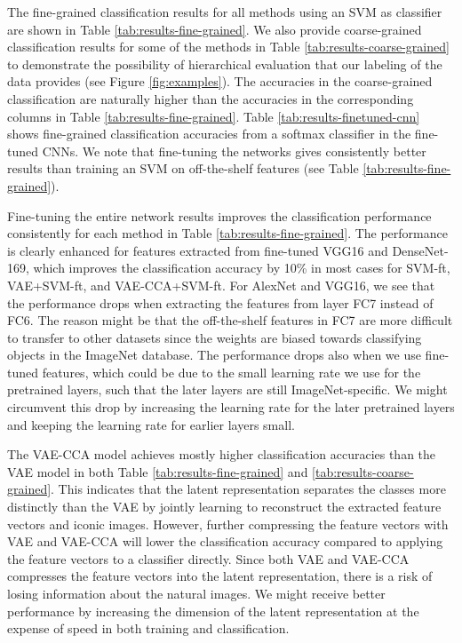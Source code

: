 The fine-grained classification results for all methods using an SVM as classifier are shown in Table \ref{tab:results-fine-grained}. We also provide coarse-grained classification results for some of the methods in Table \ref{tab:results-coarse-grained} to demonstrate the possibility of hierarchical evaluation that our labeling of the data provides (see Figure \ref{fig:examples}). The accuracies in the coarse-grained classification are naturally higher than the accuracies in the corresponding columns in Table \ref{tab:results-fine-grained}. Table \ref{tab:results-finetuned-cnn} shows fine-grained classification accuracies from a softmax classifier in the fine-tuned CNNs. We note that fine-tuning the networks gives consistently better results than training an SVM on off-the-shelf features (see Table \ref{tab:results-fine-grained}).

Fine-tuning the entire network results improves the classification performance consistently for each method in Table \ref{tab:results-fine-grained}. The performance is clearly enhanced for features extracted from fine-tuned VGG16 and DenseNet-169, which improves the classification accuracy by 10\% in most cases for SVM-ft, VAE+SVM-ft, and VAE-CCA+SVM-ft. For AlexNet and VGG16, we see that the performance drops when extracting the features from layer FC7 instead of FC6. The reason might be that the off-the-shelf features in FC7 are more difficult to transfer to other datasets since the weights are biased towards classifying objects in the ImageNet database. The performance drops also when we use fine-tuned features, which could be due to the small learning rate we use for the pretrained layers, such that the later layers are still ImageNet-specific. We might circumvent this drop by increasing the learning rate for the later pretrained layers and keeping the learning rate for earlier layers small.
 
The VAE-CCA model achieves mostly higher classification accuracies than the VAE model in both Table \ref{tab:results-fine-grained} and \ref{tab:results-coarse-grained}. This indicates that the latent representation separates the classes more distinctly than the VAE by jointly learning to reconstruct the extracted feature vectors and iconic images. However, further compressing the feature vectors with VAE and VAE-CCA will lower the classification accuracy compared to applying the feature vectors to a classifier directly. Since both VAE and VAE-CCA compresses the feature vectors into the latent representation, there is a risk of losing information about the natural images. We might receive better performance by increasing the dimension of the latent representation at the expense of speed in both training and classification.

